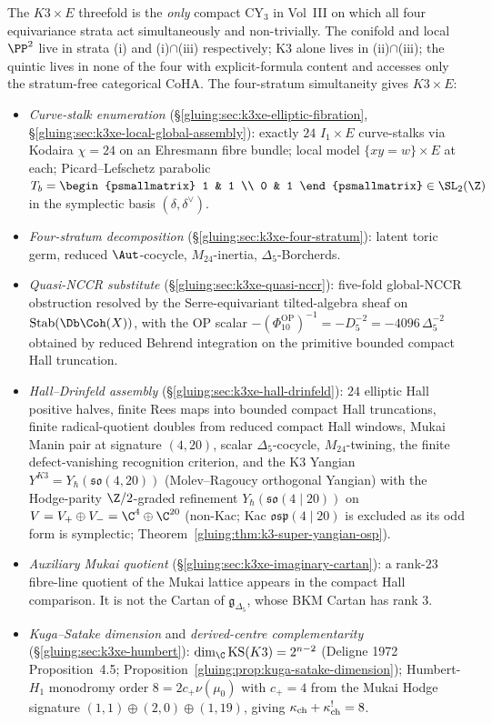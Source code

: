 The $K3 \times E$ threefold is the \emph{only} compact CY$_3$ in
Vol~III on which all four equivariance strata act simultaneously and
non-trivially. The conifold and local $\PP^2$ live in strata (i)
and (i)$\cap$(iii) respectively; K3 alone lives in (ii)$\cap$(iii);
the quintic lives in none of the four with explicit-formula content
and accesses only the stratum-free categorical CoHA. The four-stratum
simultaneity gives $K3 \times E$:
\begin{itemize}
 \item \emph{Curve-stalk enumeration} (\S\ref{gluing:sec:k3xe-elliptic-fibration},
 \S\ref{gluing:sec:k3xe-local-global-assembly}): exactly $24$
 $I_1 \times E$ curve-stalks via Kodaira $\chi = 24$ on an Ehresmann
 fibre bundle; local model $\{xy = w\} \times E$ at each; Picard--Lefschetz
 parabolic $T_b = \begin{psmallmatrix} 1 & 1 \\ 0 & 1 \end{psmallmatrix}
 \in \SL_2(\Z)$ in the symplectic basis $(\delta, \delta^\vee)$.
 \item \emph{Four-stratum decomposition}
 (\S\ref{gluing:sec:k3xe-four-stratum}): latent toric germ, reduced
 $\Aut$-cocycle, $M_{24}$-inertia, $\Delta_5$-Borcherds.
\item \emph{Quasi-NCCR substitute}
(\S\ref{gluing:sec:k3xe-quasi-nccr}): five-fold global-NCCR
obstruction resolved by the Serre-equivariant tilted-algebra sheaf
on $\mathrm{Stab}(\Db\Coh(X))$, with the OP scalar
\(-(\Phi_{10}^{\mathrm{OP}})^{-1}=-D_5^{-2}
=-4096\,\Delta_5^{-2}\) obtained by reduced Behrend integration on the
primitive bounded compact Hall truncation.
\item \emph{Hall--Drinfeld assembly}
(\S\ref{gluing:sec:k3xe-hall-drinfeld}): $24$ elliptic Hall
positive halves, finite Rees maps into bounded compact Hall
truncations, finite radical-quotient doubles from reduced compact Hall
windows, Mukai Manin pair at signature $(4, 20)$, scalar
$\Delta_5$-cocycle, $M_{24}$-twining, the finite defect-vanishing
recognition criterion, and the K$3$ Yangian
$Y^{K3} = Y_\hbar(\mathfrak{so}(4, 20))$
 (Molev--Ragoucy orthogonal Yangian) with the Hodge-parity
 $\Z/2$-graded refinement \(Y_\hbar(\mathfrak{so}(4 \mid 20))\) on
 $V = V_+ \oplus V_- = \C^4 \oplus \C^{20}$ (non-Kac; Kac
 $\mathfrak{osp}(4 \mid 20)$ is excluded as its odd form is
 symplectic; Theorem~\ref{gluing:thm:k3-super-yangian-osp}).
 \item \emph{Auxiliary Mukai quotient}
 (\S\ref{gluing:sec:k3xe-imaginary-cartan}): a rank-\(23\) fibre-line quotient of the Mukai lattice appears in the compact Hall comparison. It is not the Cartan of \(\mathfrak g_{\Delta_5}\), whose BKM Cartan has rank \(3\).
\item \emph{Kuga--Satake dimension} and \emph{derived-centre
 complementarity} (\S\ref{gluing:sec:k3xe-humbert}):
 $\dim_\C \mathrm{KS}(K3) = 2^{n - 2}$ (Deligne 1972
 Proposition~4.5; Proposition~\ref{gluing:prop:kuga-satake-dimension});
 Humbert-$H_1$ monodromy order $8 = 2 c_+ \nu(\mu_0)$ with $c_+ = 4$
 from the Mukai Hodge signature $(1, 1) \oplus (2, 0) \oplus (1, 19)$,
 giving $\kappa_{\mathrm{ch}} + \kappa_{\mathrm{ch}}^! = 8$.
\end{itemize}

